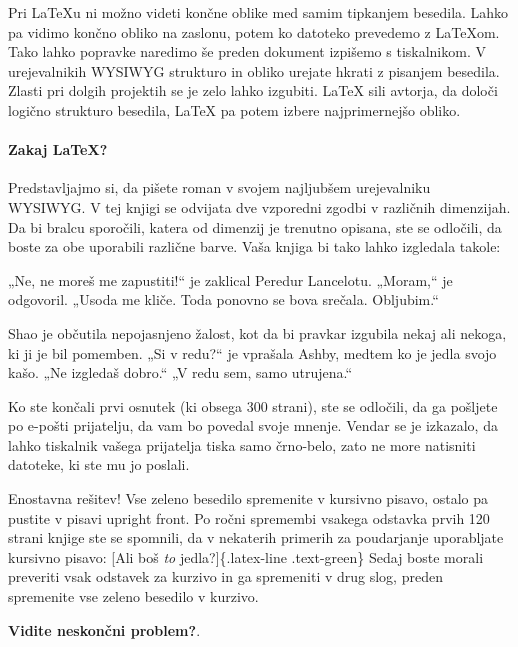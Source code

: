 Pri LaTeXu ni možno videti končne oblike med samim tipkanjem besedila.
Lahko pa vidimo končno obliko na zaslonu, potem ko datoteko prevedemo z LaTeXom.
Tako lahko popravke naredimo še preden dokument izpišemo s tiskalnikom.
V urejevalnikih WYSIWYG strukturo in obliko urejate hkrati z pisanjem besedila.
Zlasti pri dolgih projektih se je zelo lahko izgubiti.
LaTeX sili avtorja, da določi logično strukturo besedila, LaTeX pa potem izbere najprimernejšo obliko.

\paragraph{Zakaj LaTeX?}\label{latexUvod_zakaj}

Predstavljajmo si, da pišete roman v svojem najljubšem urejevalniku WYSIWYG.
V tej knjigi se odvijata dve vzporedni zgodbi v
različnih dimenzijah.
Da bi bralcu sporočili, katera od dimenzij je trenutno opisana, ste se odločili, da boste za obe uporabili različne barve.
Vaša knjiga bi tako lahko izgledala takole:

„Ne, ne moreš me zapustiti!`` je zaklical  Peredur Lancelotu.\newline
„Moram,`` je odgovoril. „Usoda me kliče. Toda ponovno se bova srečala. Obljubim.``

Shao je občutila nepojasnjeno žalost, kot da bi pravkar izgubila nekaj ali nekoga, ki ji je bil pomemben.\newline
„Si v redu?`` je vprašala Ashby, medtem ko je jedla svojo kašo.\newline
„Ne izgledaš dobro.``\newline
„V redu sem, samo utrujena.``

Ko ste končali prvi osnutek (ki obsega 300 strani), ste se odločili, da ga pošljete po e-pošti prijatelju, da vam bo povedal svoje mnenje.
Vendar se je izkazalo, da lahko tiskalnik vašega prijatelja tiska samo črno-belo, zato ne more natisniti datoteke, ki ste mu jo poslali.

Enostavna rešitev! Vse zeleno besedilo spremenite v kursivno pisavo, ostalo pa pustite v pisavi upright front.
Po ročni spremembi vsakega odstavka prvih 120 strani knjige ste se spomnili, da v nekaterih primerih za poudarjanje uporabljate kursivno pisavo:
[Ali boš \textit{to} jedla?]\{.latex-line .text-green\}
Sedaj boste morali preveriti vsak odstavek za kurzivo in ga spremeniti v drug slog, preden spremenite vse zeleno besedilo v kurzivo.

\textbf{Vidite neskončni problem?}.

